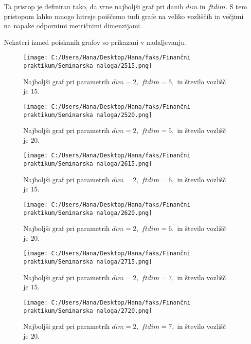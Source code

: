 \documentclass[12pt]{article}
\begin{document}
Ta pristop je definiran tako, da vrne najboljši graf pri danih $dim$ in $ftdim.$ S tem pristopom lahko mnogo hitreje
poiščemo tudi grafe na veliko vozliščih in večjimi na napake odpornimi metričnimi dimenzijami.

Nekateri izmed poiskanih grafov so prikazani v nadaljevanju.


\begin{figure}[H]
    \centering
    \texttt{[image: C:/Users/Hana/Desktop/Hana/faks/Finančni praktikum/Seminarska naloga/2515.png]}
    \caption{Najboljši graf pri parametrih $dim = 2,$ $ftdim = 5,$ in število vozlišč je $15.$}
    \label{fig:slika2515}
\end{figure}

\begin{figure}[H]
    \centering
    \texttt{[image: C:/Users/Hana/Desktop/Hana/faks/Finančni praktikum/Seminarska naloga/2520.png]}
    \caption{Najboljši graf pri parametrih $dim = 2,$ $ftdim = 5,$ in število vozlišč je $20.$}
    \label{fig:slika2520}
\end{figure}


\begin{figure}[H]
    \centering
    \texttt{[image: C:/Users/Hana/Desktop/Hana/faks/Finančni praktikum/Seminarska naloga/2615.png]}
    \caption{Najboljši graf pri parametrih $dim = 2,$ $ftdim = 6,$ in število vozlišč je $15.$}
    \label{fig:slika2615}
\end{figure}

\begin{figure}[H]
    \centering
    \texttt{[image: C:/Users/Hana/Desktop/Hana/faks/Finančni praktikum/Seminarska naloga/2620.png]}
    \caption{Najboljši graf pri parametrih $dim = 2,$ $ftdim = 6,$ in število vozlišč je $20.$}
    \label{fig:slika2620}
\end{figure}



\begin{figure}[H]
    \centering
    \texttt{[image: C:/Users/Hana/Desktop/Hana/faks/Finančni praktikum/Seminarska naloga/2715.png]}
    \caption{Najboljši graf pri parametrih $dim = 2,$ $ftdim = 7,$ in število vozlišč je $15.$}
    \label{fig:slika2715}
\end{figure}

\begin{figure}[H]
    \centering
    \texttt{[image: C:/Users/Hana/Desktop/Hana/faks/Finančni praktikum/Seminarska naloga/2720.png]}
    \caption{Najboljši graf pri parametrih $dim = 2,$ $ftdim = 7,$ in število vozlišč je $20.$}
    \label{fig:slika2720}
\end{figure}
\end{document}
